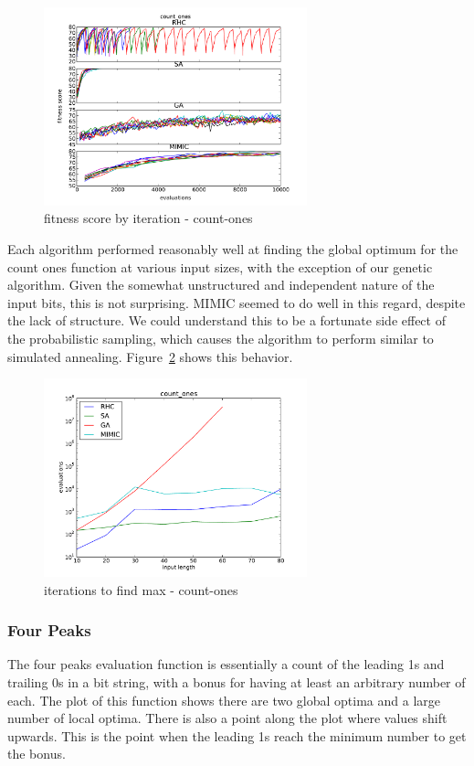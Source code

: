 \documentclass{sig-alternate}
\begin{document}
\begin{figure}[!htbp]
    \centering
    \includegraphics[width=3in]{part1.2/count-ones-over-time.pdf}
    \caption{fitness score by iteration - count-ones\label{over-time-count-ones}}
\end{figure} 

Each algorithm performed reasonably well at finding the global optimum for the count ones function at various input sizes, with the exception of our genetic algorithm. Given the somewhat unstructured and independent nature of the input bits, this is not surprising. MIMIC seemed to do well in this regard, despite the lack of structure. We could understand this to be a fortunate side effect of the probabilistic sampling, which causes the algorithm to perform similar to simulated annealing. Figure~\ref{max-count-ones} shows this behavior.

\begin{figure}[!htbp]
    \centering
    \includegraphics[width=3in]{part1.2/count-ones-max.pdf}
    \caption{iterations to find max - count-ones\label{max-count-ones}}
\end{figure} 


\subsubsection{Four Peaks}

The four peaks evaluation function is essentially a count of the leading 1s and trailing 0s in a bit string, with a bonus for having at least an arbitrary number of each. The plot of this function shows there are two global optima and a large number of local optima. There is also a point along the plot where values shift upwards. This is the point when the leading 1s reach the minimum number to get the bonus.
\end{document}
